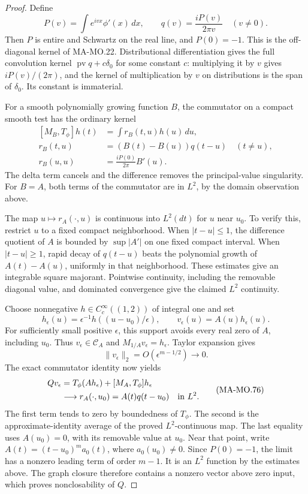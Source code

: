 \begin{proof}
Define
\[
 P(v)=\int e^{ivx}\phi'(x)\,dx,
             \qquad q(v)=\frac{iP(v)}{2\pi v}\quad(v\ne0).
 \tag{MA-MO.72}
\]
Then \(P\) is entire and Schwartz on the real line, and
\(P(0)=-1\). This is the off-diagonal kernel of MA-MO.22.
Distributional differentiation gives the full convolution
kernel \(\operatorname{pv}q+c\delta_0\) for some constant
\(c\): multiplying it by \(v\) gives \(iP(v)/(2\pi)\),
and the kernel of multiplication by \(v\) on distributions
is the span of \(\delta_0\). Its constant is immaterial.

For a smooth polynomially growing function \(B\), the
commutator on a compact smooth test has the ordinary kernel
\[
 \begin{aligned}
 [M_B,T_\phi]h(t)&=\int r_B(t,u)h(u)\,du,\\
 r_B(t,u)&=(B(t)-B(u))q(t-u)\quad(t\ne u),\\
 r_B(u,u)&=\frac{iP(0)}{2\pi}B'(u).
 \end{aligned}
 \tag{MA-MO.73}
\]
The delta term cancels and the difference removes the
principal-value singularity. For \(B=A\), both terms of
the commutator are in \(L^2\), by the domain observation
above.

The map \(u\mapsto r_A(\cdot,u)\) is continuous into
\(L^2(dt)\) for \(u\) near \(u_0\). To verify this,
restrict \(u\) to a fixed compact neighborhood. When
\(|t-u|\le1\), the difference quotient of \(A\) is
bounded by \(\sup|A'|\) on one fixed compact interval.
When \(|t-u|\ge1\), rapid decay of \(q(t-u)\) beats
the polynomial growth of \(A(t)-A(u)\), uniformly in
that neighborhood. These estimates give an integrable
square majorant. Pointwise continuity, including the
removable diagonal value, and dominated convergence give
the claimed \(L^2\) continuity.

Choose nonnegative \(h\in C_c^\infty((1,2))\) of integral
one and set
\[
 h_\epsilon(u)=\epsilon^{-1}h((u-u_0)/\epsilon),
                  \qquad v_\epsilon(u)=A(u)h_\epsilon(u).
 \tag{MA-MO.74}
\]
For sufficiently small positive \(\epsilon\), this support
avoids every real zero of \(A\), including \(u_0\).
Thus \(v_\epsilon\in\mathscr C_A\) and
\(M_{1/A}v_\epsilon=h_\epsilon\). Taylor expansion gives
\[
            \|v_\epsilon\|_2=O(\epsilon^{m-1/2})\to0.
 \tag{MA-MO.75}
\]
The exact commutator identity now yields
\[
 \begin{aligned}
 Qv_\epsilon
 &=T_\phi(Ah_\epsilon)+[M_A,T_\phi]h_\epsilon\\
 &\longrightarrow r_A(\cdot,u_0)=A(t)q(t-u_0)
                                      \quad\hbox{in }L^2.
 \end{aligned}
 \tag{MA-MO.76}
\]
The first term tends to zero by boundedness of \(T_\phi\).
The second is the approximate-identity average of the
proved \(L^2\)-continuous map. The last equality uses
\(A(u_0)=0\), with its removable value at \(u_0\).
Near that point, write \(A(t)=(t-u_0)^m a_0(t)\),
where \(a_0(u_0)\ne0\). Since \(P(0)=-1\), the limit
has a nonzero leading term of order \(m-1\). It is an
\(L^2\) function by the estimates above. The graph closure
therefore contains a nonzero vector above zero input,
which proves nonclosability of \(Q\).


\end{proof}
